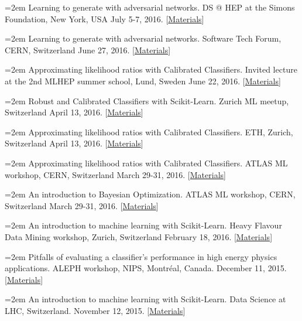 \documentclass{scrartcl}
\newcommand{\MarginText}[1]{\marginpar{\raggedleft\itshape\small#1}}
\newcommand{\NewPublication}[4]{\noindent\hangindent=2em\hangafter=0 \MarginText{\color{black} #1}{\footnotesize [{\color{Maroon}#2}]} #3 {\footnotesize\color{gray}#4}\vspace{0.5em}}
\begin{document}
\begin{cv}{}
\NewPublication{}{25}{Learning to generate with adversarial networks.}{%
DS @ HEP at the Simons Foundation, New York, USA
July 5-7, 2016.
[\href{https://indico.hep.caltech.edu/indico/conferenceTimeTable.py?confId=102}{Materials}]}

\NewPublication{}{25}{Learning to generate with adversarial networks.}{%
Software Tech Forum, CERN, Switzerland
June 27, 2016.
[\href{https://indico.cern.ch/event/544644/contributions/2210328/attachments/1299201/1938586/slides.pdf}{Materials}]}

\NewPublication{}{24}{Approximating likelihood ratios with Calibrated Classifiers.}{%
Invited lecture at the 2nd MLHEP summer school, Lund, Sweden
June 22, 2016.
[\href{https://github.com/glouppe/talk-approximating-likelihood-ratios-with-classifiers}{Materials}]}

\NewPublication{}{23}{Robust and Calibrated Classifiers with Scikit-Learn.}{%
Zurich ML meetup, Switzerland
April 13, 2016.
[\href{https://github.com/glouppe/tutorials-scikit-learn}{Materials}]}

\NewPublication{}{22}{Approximating likelihood ratios with Calibrated Classifiers.}{%
ETH, Zurich, Switzerland
April 13, 2016.
[\href{https://github.com/glouppe/talk-approximating-likelihood-ratios-with-classifiers}{Materials}]}

\NewPublication{}{21}{Approximating likelihood ratios with Calibrated Classifiers.}{%
ATLAS ML workshop, CERN, Switzerland
March 29-31, 2016.
[\href{https://github.com/glouppe/talk-approximating-likelihood-ratios-with-classifiers}{Materials}]}

\NewPublication{}{21}{An introduction to Bayesian Optimization.}{%
ATLAS ML workshop, CERN, Switzerland
March 29-31, 2016.
[\href{https://github.com/glouppe/talk-bayesian-optimisation}{Materials}]}

\NewPublication{}{21}{An introduction to machine learning with Scikit-Learn.}{%
Heavy Flavour Data Mining workshop, Zurich, Switzerland
February 18, 2016.
[\href{https://github.com/glouppe/tutorial-scikit-learn}{Materials}]}

\NewPublication{2015}{20}{Pitfalls of evaluating a classifier’s performance in high energy physics applications.}{%
ALEPH workshop, NIPS, Montréal, Canada.
December 11, 2015.
[\href{https://github.com/glouppe/talk-aleph-workshop2015}{Materials}]}

\NewPublication{}{19}{An introduction to machine learning with Scikit-Learn.}{%
Data Science at LHC, Switzerland.
November 12, 2015.
[\href{https://github.com/glouppe/tutorial-sklearn-dslhc2015}{Materials}]}


\end{cv}
\end{document}
